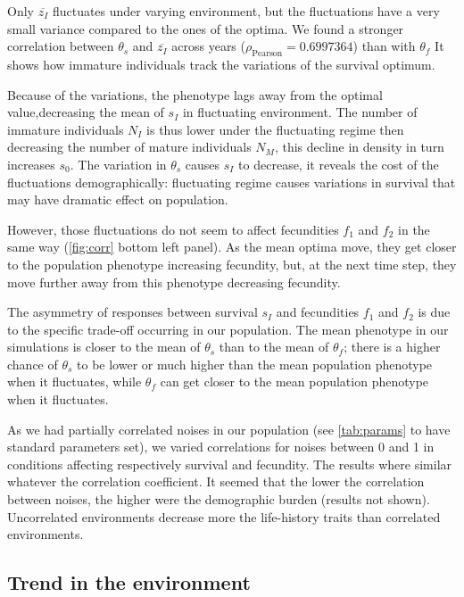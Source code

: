 Only $\overline{z_I}$ fluctuates under varying environment, but the fluctuations have a very small variance compared to the ones of the optima. We found a stronger correlation between $\theta_s$ and $\overline{z_I}$ across years ($\rho_{\text{Pearson}} = 0.6997364$) than with $\theta_f$ It shows how immature individuals track the variations of the survival optimum.

Because of the variations, the phenotype lags away from the optimal value,decreasing the mean of $s_I$ in fluctuating environment. The number of immature individuals $N_I$ is thus lower under the fluctuating regime then decreasing the number of mature individuals $N_M$, this decline in density in turn increases $s_0$. The variation in $\theta_s$ causes $s_I$ to decrease, it reveals the cost of the fluctuations demographically: fluctuating regime causes variations in survival that may have dramatic effect on population.

However, those fluctuations do not seem to affect fecundities $f_1$ and $f_2$ in the same way (\autoref{fig:corr} bottom left panel). As the mean optima move, they get closer to the population phenotype increasing fecundity, but, at the next time step, they move further away from this phenotype decreasing fecundity.

The asymmetry of responses between survival $s_I$ and fecundities $f_1$ and $f_2$ is due to the specific trade-off occurring in our population. The mean phenotype in our simulations is closer to the mean of $\theta_s$ than to the mean of $\theta_f$; there is a higher chance of $\theta_s$ to be lower or much higher than the mean population phenotype when it fluctuates, while $\theta_f$ can get closer to the mean population phenotype when it fluctuates.

As we had partially correlated noises in our population (see \autoref{tab:params} to have standard parameters set), we varied correlations for noises between 0 and 1 in conditions affecting respectively survival and fecundity. The results where similar whatever the correlation coefficient. It seemed that the lower the correlation between noises, the higher were the demographic burden (results not shown). Uncorrelated environments decrease more the life-history traits than correlated environments.

\subsection*{Trend in the environment}

